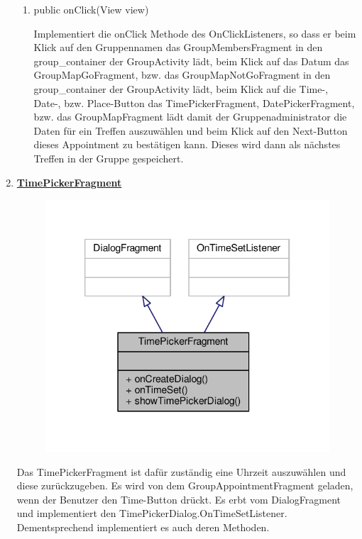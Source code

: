 \begin{enumerate}
\begin{enumerate}
		\item public onClick(View view)
		
		Implementiert die onClick Methode des OnClickListeners, so dass er beim Klick auf den Gruppennamen das GroupMembersFragment in den group\_container der GroupActivity lädt, beim Klick auf das Datum das GroupMapGoFragment, bzw. das GroupMapNotGoFragment in den group\_container der GroupActivity lädt, beim Klick auf die Time-, Date-, bzw. Place-Button das TimePickerFragment, DatePickerFragment, bzw. das GroupMapFragment lädt damit der Gruppenadministrator die Daten für ein Treffen auszuwählen und beim Klick auf den Next-Button dieses Appointment zu bestätigen kann. Dieses wird dann als nächstes Treffen in der Gruppe gespeichert.
		
	\end{enumerate}
	\item \textbf{\underline{TimePickerFragment}}

	\begin{figure}[H]
		\includegraphics[scale = 1]{res/time_picker_fragment__inherit__graph.pdf}
		\centering
	\end{figure}
	Das TimePickerFragment ist dafür zuständig eine Uhrzeit auszuwählen und diese zurückzugeben. Es wird von dem GroupAppointmentFragment geladen, wenn der Benutzer den Time-Button drückt. Es erbt vom DialogFragment und implementiert den TimePickerDialog.OnTimeSetListener. Dementsprechend implementiert es auch deren Methoden.


\end{enumerate}
